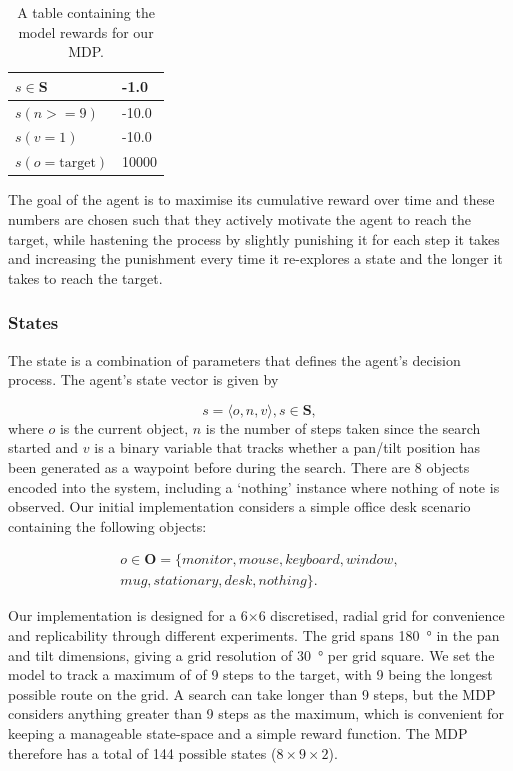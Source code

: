 \documentclass[a4paper, twoside]{article}
\begin{document}
\begin{table}
  \centering
  \caption{A table containing the model rewards for our MDP. }\label{tab:rewards}
  \begin{tabular}{ll}
    \toprule
    $s\in\mathbf{S}$ & -1.0  \\ \midrule
    $s(n >= 9)$ & -10.0 \\ \midrule
    $s(v = 1)$  & -10.0 \\ \midrule
    $s(o = \text{target})$ & 10000 \\ \midrule
    \bottomrule
  \end{tabular}
\end{table}

The goal of the agent is to maximise its cumulative reward over time and these numbers are chosen such that they actively motivate the agent to reach the target, while hastening the process by slightly punishing it for each step it takes and increasing the punishment every time it re-explores a state and the longer it takes to reach the target. 

\subsubsection{States}\label{sec:states}

\noindent The state is a combination of parameters that defines the agent's decision process. The agent's state vector is given by 

\begin{equation}
  s = \langle{}o, n, v\rangle, s\in{}\mathbf{S}, 
\end{equation}
where $o$ is the current object, $n$ is the number of steps taken since the search started and $v$ is a binary variable that tracks whether a pan/tilt position has been generated as a waypoint before during the search. There are 8 objects encoded into the system, including a `nothing' instance where nothing of note is observed. Our initial implementation considers a simple office desk scenario containing the following objects:

\begin{equation}
  \begin{aligned}
    o\in \mathbf{O} = \{monitor, mouse, keyboard, window,\\mug, stationary, desk, nothing\}.
  \end{aligned}
\end{equation}

Our implementation is designed for a 6$\times$6 discretised, radial grid for convenience and replicability through different experiments. The grid spans \SI{180}{\degree} in the pan and tilt dimensions, giving a grid resolution of \SI{30}{\degree} per grid square. We set the model to track a maximum of of 9 steps to the target, with 9 being the longest possible route on the grid. A search can take longer than 9 steps, but the MDP considers anything greater than 9 steps as the maximum, which is convenient for keeping a manageable state-space and a simple reward function. The MDP therefore has a total of 144 possible states ($8\times9\times2$).
\end{document}
